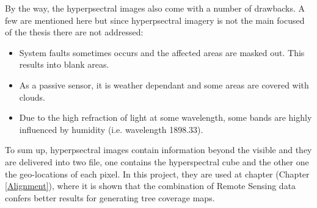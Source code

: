 \documentclass{subfiles}
\begin{document}
	By the way, the hyperpsectral images also come with a number of drawbacks. A few are mentioned here but since hyperpsectral imagery is not the main focused of the thesis there are not addressed:
	\begin{itemize}
		\item System faults sometimes occurs and the affected areas are masked out. This results into blank areas. 
		\item As a passive sensor, it is weather dependant and some areas are covered with clouds.
		\item Due to the high refraction of light at some wavelength, some bands are highly influenced by humidity (i.e. wavelength 1898.33).
	\end{itemize}
	
	To sum up, hyperpsectral images contain information beyond the visible and they are delivered into two file, one contains the hyperspectral cube and the other one the geo-locations of each pixel. In this project, they are used at chapter (Chapter \ref{Alignment}), where it is shown that the combination of Remote Sensing data confers better results for generating tree coverage maps. 
	
	
	
	
\end{document}
